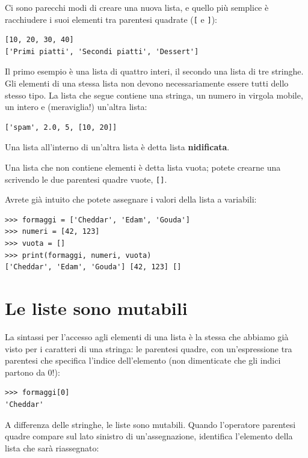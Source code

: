 \documentclass[10pt]{book}
\begin{document}
Ci sono parecchi modi di creare una nuova lista, e quello più semplice
è racchiudere i suoi elementi tra parentesi quadrate (\verb"[" e \verb"]"):

\begin{verbatim}
[10, 20, 30, 40]
['Primi piatti', 'Secondi piatti', 'Dessert']
\end{verbatim}
%
Il primo esempio è una lista di quattro interi, il secondo una lista
di tre stringhe. Gli elementi di una stessa lista non devono
necessariamente essere tutti dello stesso tipo. La lista che segue
contiene una stringa, un numero in virgola mobile, un intero e (meraviglia!) un'altra lista:

\begin{verbatim}
['spam', 2.0, 5, [10, 20]]
\end{verbatim}
%
Una lista all'interno di un'altra lista è detta lista {\bf nidificata}.

Una lista che non contiene elementi è detta lista vuota; potete crearne una scrivendo le due parentesi quadre vuote, \verb"[]".

Avrete già intuito che potete assegnare i valori della lista a variabili:

\begin{verbatim}
>>> formaggi = ['Cheddar', 'Edam', 'Gouda']
>>> numeri = [42, 123]
>>> vuota = []
>>> print(formaggi, numeri, vuota)
['Cheddar', 'Edam', 'Gouda'] [42, 123] []
\end{verbatim}
%


\section{Le liste sono mutabili}
\label{mutable}

La sintassi per l'accesso agli elementi di una lista è la stessa che abbiamo già visto per i caratteri di una stringa: le parentesi quadre, con un'espressione tra parentesi che specifica l'indice dell'elemento (non dimenticate che gli indici partono da 0!):

\begin{verbatim}
>>> formaggi[0]
'Cheddar'
\end{verbatim}
%
A differenza delle stringhe, le liste sono mutabili. Quando l'operatore parentesi quadre compare sul lato sinistro di un'assegnazione, identifica l'elemento della lista che sarà riassegnato:
\end{document}
